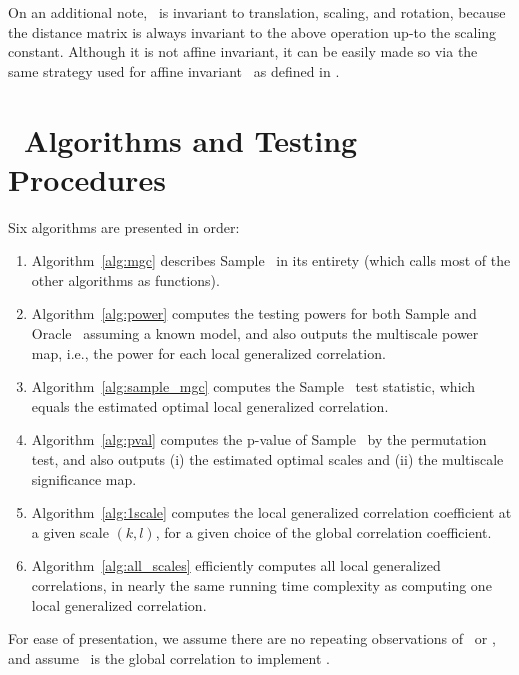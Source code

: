 \documentclass[11pt]{extarticle}
\begin{document}
On an additional note, \Mgc~is invariant to translation, scaling, and rotation, because the distance matrix is always invariant to the above operation up-to the scaling constant. Although it is not affine invariant, it can be easily made so via the same strategy used for affine invariant \Dcorr~as defined in \cite{SzekelyRizzoBakirov2007, Dueck2014}. %


\clearpage

\section{\Mgc~Algorithms and Testing Procedures}
\label{appen:algorithms}

Six algorithms are presented in order:
\begin{enumerate}
\item Algorithm~\ref{alg:mgc} describes Sample \Mgc~in its entirety (which calls most of the other algorithms as functions).
\item Algorithm~\ref{alg:power} computes the testing powers for both Sample and Oracle \Mgc~assuming a known model, and also outputs  the multiscale power map, i.e., the power for each local generalized correlation.
\item Algorithm~\ref{alg:sample_mgc} computes the Sample \Mgc~test statistic, which equals the estimated optimal local generalized correlation.
\item Algorithm~\ref{alg:pval} computes the p-value of Sample \Mgc~by the permutation test, and also outputs (i) the estimated optimal scales and (ii) the multiscale significance map.
\item Algorithm~\ref{alg:1scale} computes the local generalized correlation coefficient at a given scale $(k,l)$, for a given choice of the global correlation coefficient.
\item Algorithm~\ref{alg:all_scales} efficiently computes all local generalized correlations, in nearly the same running time complexity as computing one local generalized correlation.
\end{enumerate}
For ease of presentation, we assume there are no repeating observations of \mbx~or \mby, and assume \Mcorr~is the global correlation to implement \Mgc.
\end{document}

